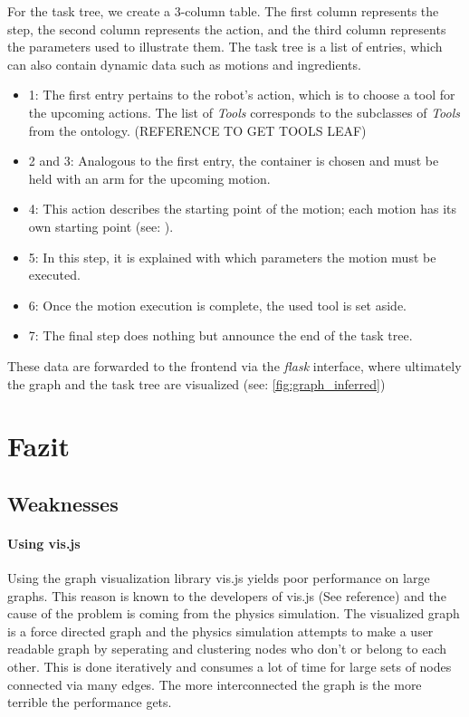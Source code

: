 For the task tree, we create a 3-column table. The first column represents the step, the second column represents the action, and the third column represents the parameters used to illustrate them. The task tree is a list of entries, which can also contain dynamic data such as motions and ingredients.

\begin{itemize}
    \item 1: The first entry pertains to the robot's action, which is to choose a tool for the upcoming actions. The list of \textit{Tools} corresponds to the subclasses of \textit{Tools} from the ontology. (REFERENCE TO GET TOOLS LEAF)
    \item 2 and 3: Analogous to the first entry, the container is chosen and must be held with an arm for the upcoming motion.
    \item 4: This action describes the starting point of the motion; each motion has its own starting point (see: ).
    \item 5: In this step, it is explained with which parameters the motion must be executed.
    \item 6: Once the motion execution is complete, the used tool is set aside.
    \item 7: The final step does nothing but announce the end of the task tree.
    \end{itemize}

These data are forwarded to the frontend via the \textit{flask} interface, where ultimately the graph and the task tree are visualized (see: \ref{fig:graph_inferred})

\section{Fazit}

\subsection{Weaknesses}

\paragraph{Using vis.js}
Using the graph visualization library vis.js yields poor performance on large graphs.
This reason is known to the developers of vis.js (See reference) and the cause of the problem is coming
from the physics simulation. The visualized graph is a force directed graph and the physics simulation attempts to make a user readable graph 
by seperating and clustering nodes who don't or belong to each other. This is done iteratively and consumes a lot of time for large sets of nodes
connected via many edges. The more interconnected the graph is the more terrible the performance gets. 

